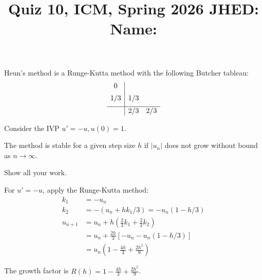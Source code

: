 \documentclass[reqno, answers]{exam}
\title{\normalsize{Quiz 10, ICM, Spring 2026 \hspace{1ex} JHED: \underline{\hspace{20ex}} \hspace{2ex} Name: \underline{\hspace{40ex}}}}
\author{}
\date{}
\begin{document}
\maketitle
\vspace{-2cm} %

\begin{questions}
\question[10]
  Heun's method is a Runge-Kutta method with the following Butcher tableau:
\begin{equation*}
            \begin{array}{c|cc}
              0   &      &     \\[0.5em]
              1/3   & 1/3  &     \\[0.5em]
              \hline
                  & 2/3 & 2/3 \\
            \end{array}
\end{equation*}

Consider the IVP $u' = -u, u(0) = 1$.

The method is stable for a given step size $h$ if $|u_n|$ does not grow without bound as $n \to \infty$.


Show all your work.

\begin{solution}
For $u' = -u$, apply the Runge-Kutta method:
\begin{align*}
k_1 &= -u_n \\
k_2 &= -(u_n + hk_1/3) = -u_n(1 - h/3) \\
u_{n+1} &= u_n + h\left(\frac{2}{3}k_1 + \frac{2}{3}k_2\right) \\
&= u_n + \frac{2h}{3}[-u_n - u_n(1-h/3)] \\
&= u_n\left(1 - \frac{4h}{3} + \frac{2h^2}{9}\right)
\end{align*}

The growth factor is $R(h) = 1 - \frac{4h}{3} + \frac{2h^2}{9}$.


\end{solution}
\end{questions}
\end{document}
